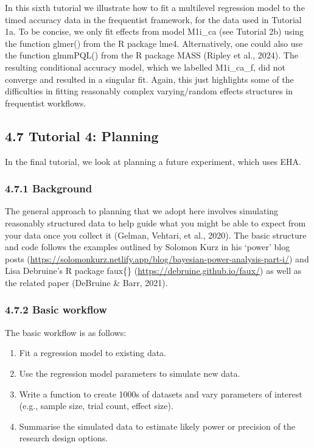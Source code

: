 \documentclass[
  man, donotrepeattitle,floatsintext]{apa6}
\providecommand{\tightlist}{%
  \setlength{\itemsep}{0pt}\setlength{\parskip}{0pt}}
\begin{document}
In this sixth tutorial we illustrate how to fit a multilevel regression model to the timed accuracy data in the frequentist framework, for the data used in Tutorial 1a. To be concise, we only fit effects from model M1i\_ca (see Tutorial 2b) using the function glmer() from the R package lme4. Alternatively, one could also use the function glmmPQL() from the R package MASS (Ripley et al., 2024). The resulting conditional accuracy model, which we labelled M1i\_ca\_f, did not converge and resulted in a singular fit. Again, this just highlights some of the difficulties in fitting reasonably complex varying/random effects structures in frequentist workflows.

\subsection{4.7 Tutorial 4: Planning}\label{tutorial-4-planning}

In the final tutorial, we look at planning a future experiment, which uses EHA.

\subsubsection{4.7.1 Background}\label{background}

The general approach to planning that we adopt here involves simulating reasonably structured data to help guide what you might be able to expect from your data once you collect it (Gelman, Vehtari, et al., 2020).
The basic structure and code follows the examples outlined by Solomon Kurz in his `power' blog posts (\url{https://solomonkurz.netlify.app/blog/bayesian-power-analysis-part-i/}) and Lisa Debruine's R package faux\{\} (\url{https://debruine.github.io/faux/}) as well as the related paper (DeBruine \& Barr, 2021).

\subsubsection{4.7.2 Basic workflow}\label{basic-workflow}

The basic workflow is as follows:

\begin{enumerate}
\def\labelenumi{\arabic{enumi}.}
\tightlist
\item
  Fit a regression model to existing data.
\item
  Use the regression model parameters to simulate new data.
\item
  Write a function to create 1000s of datasets and vary parameters of interest (e.g., sample size, trial count, effect size).
\item
  Summarise the simulated data to estimate likely power or precision of the research design options.
\end{enumerate}
\end{document}
